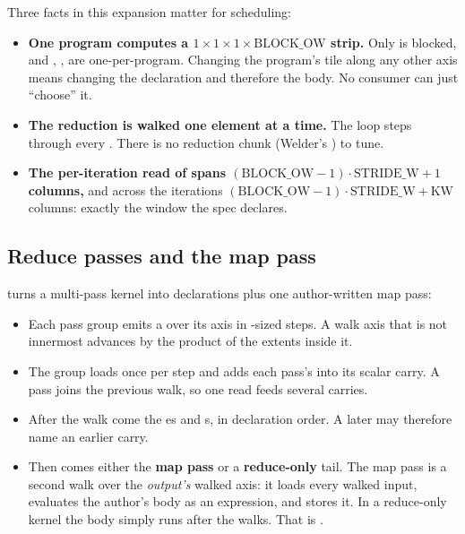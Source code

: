 Three facts in this expansion matter for scheduling:
\begin{itemize}
\item \textbf{One program computes a $1\times1\times1\times\text{BLOCK\_OW}$ strip.} Only
   is blocked, and , ,  are one-per-program.
  Changing the program's tile along any other axis means changing the declaration
  and therefore the body. No consumer can just ``choose'' it.
\item \textbf{The reduction is walked one element at a time.} The loop steps through
  every . There is no reduction chunk (Welder's ) to
  tune.
\item \textbf{The per-iteration read of  spans
  $(\text{BLOCK\_OW}-1)\cdot \text{STRIDE\_W}+1$ columns,} and across the 
  iterations
  $(\text{BLOCK\_OW}-1)\cdot\text{STRIDE\_W}+\text{KW}$ columns: exactly the window
  the spec declares.
\end{itemize}

\subsection{Reduce passes and the map pass}

 turns a multi-pass kernel into declarations plus one
author-written map pass:
\begin{itemize}
\item Each pass group emits a  over its  axis in
  -sized steps. A walk axis that is not innermost advances by the product
  of the extents inside it.
\item The group loads  once per step and adds each pass's  into
  its scalar carry. A  pass joins the previous walk, so one read feeds
  several carries.
\item After the walk come the es and s, in declaration
  order. A later  may therefore name an earlier carry.
\item Then comes either the \textbf{map pass} or a \textbf{reduce-only} tail. The map
  pass is a second walk over the \emph{output's} walked axis: it loads every walked
  input, evaluates the author's body as an expression, and stores it. In a
  reduce-only kernel the body simply runs after the walks. That is
  .
\end{itemize}

